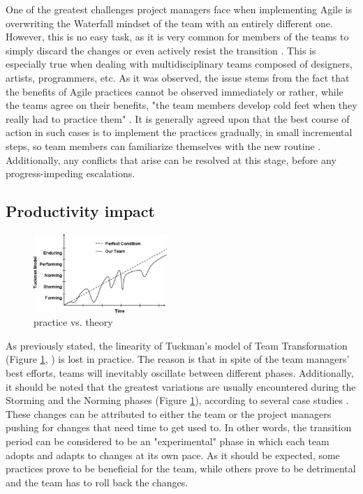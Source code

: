 \documentclass{scrartcl}
\begin{document}
    One of the greatest challenges project managers face when implementing Agile is overwriting the Waterfall mindset of the team with an entirely different one. However, this is no easy task, as it is very common for members of the teams to simply discard the changes or even actively resist the transition \cite{MtnGoat}. This is especially true when dealing with multidisciplinary teams composed of designers, artists, programmers, etc. As it was observed, the issue stems from the fact that the benefits of Agile practices cannot be observed immediately or rather, while the teams agree on their benefits, "the team members develop cold feet when they really had to practice them" \cite{4599456}. It is generally agreed upon that the best course of action in such cases is to implement the practices gradually, in small incremental steps, so team members can familiarize themselves with the new routine \cite{4293601, 4599458, AgileManifesto}. Additionally, any conflicts that arise can be resolved at this stage, before any progress-impeding escalations.
    
    \newpage
    
    \subsection{Productivity impact}
    
    \begin{figure}
        \centering
        \includegraphics[width=0.45\textwidth]{tuckman.jpg}
        \caption{practice vs. theory}
        \label{fig:tuckman}
    \end{figure}
    
    As previously stated, the linearity of Tuckman's model of Team Transformation (Figure \ref{fig:tuckman}, \cite{tuckmanModel}) is lost in practice. The reason is that in spite of the team managers' best efforts, teams will inevitably oscillate between different phases. Additionally, it should be noted that the greatest variations are usually encountered during the Storming and the Norming phases (Figure \ref{fig:tuckman}), according to several case studies \cite{4599456, 4599458}. These changes can be attributed to either the team or the project managers pushing for changes that need time to get used to. In other words, the transition period can be considered to be an "experimental" phase in which each team adopts and adapts to changes at its own pace. As it should be expected, some practices prove to be beneficial for the team, while others prove to be detrimental and the team has to roll back the changes. \\
    
\end{document}
